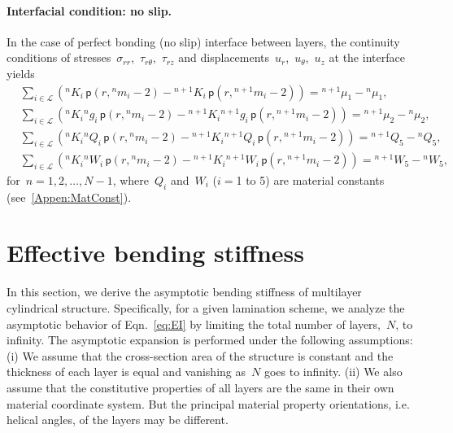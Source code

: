 \documentclass[preprint,12pt,times]{elsarticle}
\numberwithin{equation}{section}
\newcommand{\pr}[1]{\left( #1 \right)}
\newcommand{\p}{\,\mathsf{p}}
\renewcommand{\>}{$\Rightarrow$}
\begin{document}
\paragraph{Interfacial condition: no slip.}

In the case of perfect bonding (no slip) interface between layers, the continuity conditions of stresses~$\sigma_{rr}$,~$\tau_{r\theta}$,~$\tau_{rz}$ and displacements~$u_{r}$,~$u_{\theta}$,~$u_z$ at the interface yields
\begin{subequations}
	\begin{align}
	& \sum_{i \in \mathcal{L}} \left( {}^{n}\!{K_{i}} \p\pr{r,{}^{n}\!{m_{i}} - 2} - {}^{n+1}\!{K_{i}} \p\pr{r,{}^{n+1}\!{m_{i}} - 2} \right) = {}^{n+1}\!{\mu_{1}}
  - {}^{n}\!{\mu_{1}}, \\
	& \sum_{i \in \mathcal{L}} \left( {}^{n}\!{K_{i}} {}^{n}\!{g_{i}} \p\pr{r,{}^{n}\!{m_{i}} - 2} - {}^{n+1}\!{K_{i}} {}^{n+1}\!{g_{i}} \p\pr{r,{}^{n+1}\!{m_{i}} - 2} \right) = {}^{n+1}\!{\mu_{2}} - {}^{n}\!{\mu_{2}}, \\
	& \sum_{i \in \mathcal{L}} \left( {}^{n}\!{K_{i}} {}^{n}\!{Q_{i}} \p\pr{r,{}^{n}\!{m_{i}} - 2} - {}^{n+1}\!{K_{i}} {}^{n+1}\!{Q_{i}} \p\pr{r,{}^{n+1}\!{m_{i}} - 2} \right) = {}^{n+1}\!{Q_{5}} - {}^{n}\!{Q_{5}}, \\
	& \sum_{i \in \mathcal{L}} \left( {}^{n}\!{K_{i}} {}^{n}\!{W_{i}} \p\pr{r,{}^{n}\!{m_{i}} - 2} - {}^{n+1}\!{K_{i}} {}^{n+1}\!{W_{i}} \p\pr{r,{}^{n+1}\!{m_{i}} - 2} \right) = {}^{n+1}\!{W_{5}} - {}^{n}\!{W_{5}},
	\end{align}
	\label{eq:noslip_interface}
\end{subequations}
for~$n = 1,2,\dots,N-1$, where~$Q_i$ and~$W_i$ ($i=$1 to 5) are material constants (see~\ref{Appen:MatConst}).





\section{Effective bending stiffness}
\label{sec:limit_analysis}
In this section, we derive the asymptotic bending stiffness of multilayer cylindrical structure.
Specifically, for a given lamination scheme, we analyze the asymptotic behavior of Eqn.~\eqref{eq:EI} by limiting the total number of layers,~$N$, to infinity.
The asymptotic expansion is performed under the following assumptions: (i) We assume that the cross-section area of the structure is constant and the thickness of each layer is equal and vanishing as~$N$ goes to infinity. (ii) We also assume that the constitutive properties of all layers are the same in their own material coordinate system. But the principal material property orientations, i.e. helical angles, of the layers may be different.
\end{document}
